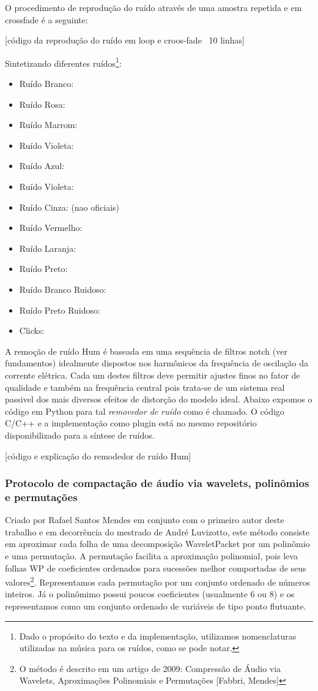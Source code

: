 O procedimento de reprodução do ruído através de uma amostra repetida e em crossfade é a seguinte:

[código da reprodução do ruído em loop e croos-fade ~10 linhas]

Sintetizando diferentes ruídos\footnote{Dado o propósito do texto e da implementação, utilizamos nomenclaturas utilizadas na música para os ruídos, como se pode notar.}:
\begin{itemize}
    \item Ruído Branco: 
    \item Ruído Rosa:
    \item Ruído Marrom:
    \item Ruído Violeta:
    \item Ruído Azul:
    \item Ruído Violeta:
    \item Ruído Cinza:
    (nao oficiais)
    \item Ruído Vermelho:
    \item Ruído Laranja:
    \item Ruído Preto:
    \item Ruído Branco Ruidoso:
    \item Ruído Preto Ruidoso:
    \item Clicks:
\end{itemize} 

A remoção de ruído Hum é baseada em uma sequência de filtros notch (ver fundamentos) idealmente dispostos nos harmônicos da frequência de oscilação da corrente elétrica. Cada um destes filtros deve permitir ajustes finos no fator de qualidade e também na frequência central pois trata-se de um sistema real passivel dos mais diversos efeitos de distorção do modelo ideal. Abaixo expomos o código em Python para tal \emph{removedor de ruído} como é chamado. O código C/C++ e a implementação como plugin está no mesmo repositório disponibilizado para a síntese de ruídos.

[código e explicação do remodedor de ruído Hum]


      \subsubsection{Protocolo de compactação de áudio via wavelets, polinômios e permutações}
Criado por Rafael Santos Mendes em conjunto com o primeiro autor deste trabalho e em decorrência do mestrado de André Luvizotto, este método
consiste em aproximar cada folha de uma decomposição WaveletPacket por um polinômio e uma permutação. A permutação facilita a aproximação polinomial, pois leva folhas WP de coeficientes ordenados para sucessões melhor comportadas de seus valores\footnote{O método é descrito em um artigo de 2009: Compressão de Áudio via Wavelets, Aproximações Polinomiais e Permutações [Fabbri, Mendes]}.
Representamos cada permutação por um conjunto ordenado de números inteiros. Já o polinômimo possui poucos coeficientes (usualmente 6 ou 8) e os representamos como um conjunto ordenado de variáveis de tipo ponto flutuante.


